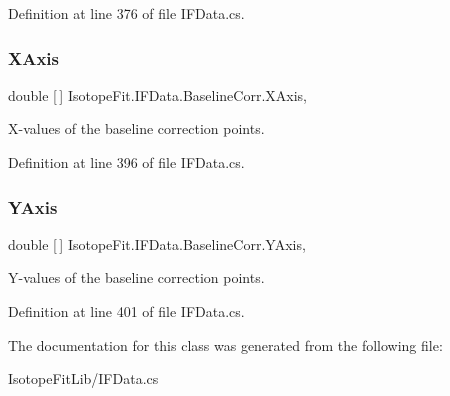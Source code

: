 Definition at line 376 of file I\+F\+Data.\+cs.

\mbox{\label{class_isotope_fit_1_1_i_f_data_1_1_baseline_corr_a90e35ea8c62d07f0279f4b5f7d440491}} 
\subsubsection{\texorpdfstring{X\+Axis}{XAxis}}
{\footnotesize\ttfamily double \mbox{[}$\,$\mbox{]} Isotope\+Fit.\+I\+F\+Data.\+Baseline\+Corr.\+X\+Axis\hspace{0.3cm}{\ttfamily [get]}, {\ttfamily [set]}}



X-\/values of the baseline correction points. 



Definition at line 396 of file I\+F\+Data.\+cs.

\mbox{\label{class_isotope_fit_1_1_i_f_data_1_1_baseline_corr_aa71067f79827da27836daa705413133c}} 
\subsubsection{\texorpdfstring{Y\+Axis}{YAxis}}
{\footnotesize\ttfamily double \mbox{[}$\,$\mbox{]} Isotope\+Fit.\+I\+F\+Data.\+Baseline\+Corr.\+Y\+Axis\hspace{0.3cm}{\ttfamily [get]}, {\ttfamily [set]}}



Y-\/values of the baseline correction points. 



Definition at line 401 of file I\+F\+Data.\+cs.



The documentation for this class was generated from the following file\+:\begin{DoxyCompactItemize}
\item 
Isotope\+Fit\+Lib/I\+F\+Data.\+cs\end{DoxyCompactItemize}
